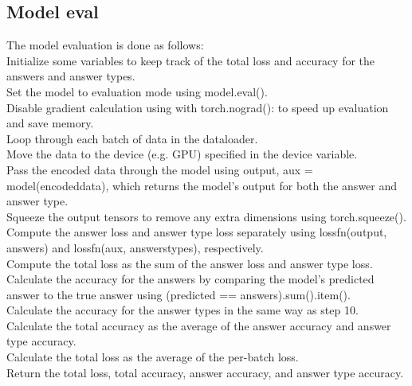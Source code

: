 \documentclass{report}
\begin{document}
\subsection{Model eval}
The model evaluation is done as follows:\\
Initialize some variables to keep track of the total loss and accuracy for the answers and answer types.\\
Set the model to evaluation mode using model.eval().\\
Disable gradient calculation using with torch.nograd(): to speed up evaluation and save memory.\\
Loop through each batch of data in the dataloader.\\
Move the data to the device (e.g. GPU) specified in the device variable.\\
Pass the encoded data through the model using output, aux = model(encodeddata), which returns the model's output for both the answer and answer type.\\
Squeeze the output tensors to remove any extra dimensions using torch.squeeze().\\
Compute the answer loss and answer type loss separately using lossfn(output, answers) and lossfn(aux, answerstypes), respectively.\\
Compute the total loss as the sum of the answer loss and answer type loss.\\
Calculate the accuracy for the answers by comparing the model's predicted answer to the true answer using (predicted == answers).sum().item().\\
Calculate the accuracy for the answer types in the same way as step 10.\\
Calculate the total accuracy as the average of the answer accuracy and answer type accuracy.\\
Calculate the total loss as the average of the per-batch loss.\\
Return the total loss, total accuracy, answer accuracy, and answer type accuracy.\\
\end{document}
